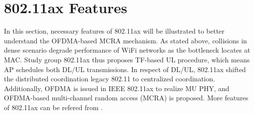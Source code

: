\documentclass[journal]{IEEEtran}
\begin{document}
%
%


\section{802.11ax Features}			\label{sec_ax_feature}
In this section, necessary features of 802.11ax will be illustrated to better understand the OFDMA-based MCRA mechanism.
As stated above, collisions in dense scenario degrade performance of WiFi networks as the bottleneck locates at MAC.
Study group 802.11ax thus proposes TF-based UL procedure, which means AP schedules both DL/UL transmissions.
In respect of DL/UL, 802.11ax shifted the distributed coordination legacy 802.11 to centralized coordination.
Additionally, OFDMA is issued in IEEE 802.11ax to realize MU PHY, and OFDMA-based multi-channel random access (MCRA) is proposed.
More features of 802.11ax can be refered from \cite{dengquality}.
\end{document}
